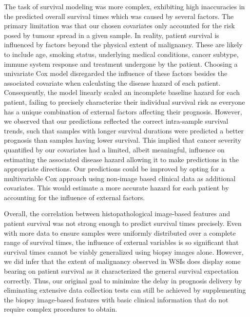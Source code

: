 \documentclass{l4proj}
\begin{document}
The task of survival modeling was more complex, exhibiting high inaccuracies in the predicted overall survival times which was caused by several factors. The primary limitation was that our chosen covariates only accounted for the risk posed by tumour spread in a given sample. In reality, patient survival is influenced by factors beyond the physical extent of malignancy. These are likely to include age, smoking status, underlying medical conditions, cancer subtype, immune system response and treatment undergone by the patient. Choosing a univariate Cox model disregarded the influence of these factors besides the associated covariate when calculating the disease hazard of each patient. Consequently, the model linearly scaled an incomplete baseline hazard for each patient, failing to precisely characterize their individual survival risk as everyone has a unique combination of external factors affecting their prognosis. However, we observed that our predictions reflected the correct intra-sample survival trends, such that samples with longer survival durations were predicted a better prognosis than samples having lower survival. This implied that cancer severity quantified by our covariates had a limited, albeit meaningful, influence on estimating the associated disease hazard allowing it to make predictions in the appropriate directions. Our predictions could be improved by opting for a multivariable Cox approach using non-image based clinical data as additional covariates. This would estimate a more accurate hazard for each patient by accounting for the influence of external factors.  

Overall, the correlation between histopathological image-based features and patient survival was not strong enough to predict survival times precisely. Even with more data to ensure samples were uniformly distributed over a complete range of survival times, the influence of external variables is so significant that survival times cannot be viably generalized using biopsy images alone. However, we did infer that the extent of malignancy observed in WSIs does display some bearing on patient survival as it characterized the general survival expectation correctly. Thus, our original goal to minimize the delay in prognosis delivery by eliminating extensive data collection tests can still be achieved by supplementing the biopsy image-based features with basic clinical information that do not require complex procedures to obtain. 
\end{document}

